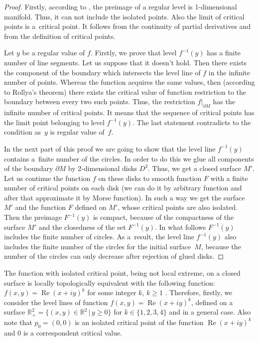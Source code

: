 \documentclass[10pt,a4paper]{amsart}
\numberwithin{equation}{section}
\begin{document}
\begin{proof} Firstly, according to \cite[Lemma~1]{Milnor}, the preimage of a regular level is 1-dimensional manifold. Thus, it can not include the isolated points. Also the limit of critical points is a~critical point. It follows from the continuity of partial derivatives and from the def\/inition of critical points.

Let $y$ be a regular value of $f$. Firstly, we prove that level $f^{-1}(y)$ has a f\/inite number of line segments. Let us suppose that it doesn't hold. Then there exists the component of the boundary which intersects the level line of $f$ in the inf\/inite number of points. Whereas the function acquires the same values, then (according to Rollya's theorem) there exists the critical value of function restriction to the boundary between every two such points. Thus, the restriction $f|_{\partial M}$ has the inf\/inite number of critical points. It means that the sequence of critical points has the limit point belonging to level $f^{-1}(y)$. The last statement contradicts to the condition as~$y$ is regular value of~$f$.

In the next part of this proof we are going to show that the level line $f^{-1}(y)$ contains a~f\/inite number of the circles. In order to do this we glue all components of the boundary $\partial M$ by 2-di\-men\-sional disks $D^{2}$. Thus, we get a closed surface $M'$. Let us continue the function $f$ on these disks to smooth function $F$ with a f\/inite number of critical points on each disk (we can do it by arbitrary function and after that approximate it by Morse function). In such a way we get the surface $M'$ and the function $F$ def\/ined on $M'$, whose critical points are also isolated. Then the preimage $F^{-1}(y)$ is compact, because of the compactness of the surface $M'$ and the closedness of the set $F^{-1}(y)$. In what follows $F^{-1}(y)$ includes the f\/inite number of circles. As a~result, the level line $f^{-1}(y)$ also includes the f\/inite number of the circles for the initial surface~$M$, because the number of the circles can only decrease after rejection of glued disks.
\end{proof}

The function with isolated critical point, being not local extreme, on a closed surface is locally topologically equivalent with the following function: $f(x,y)=\operatorname{Re}(x+iy)^{k}$ for some integer $k$, $k\geq1$ \cite{Prishlyak2002}. Therefore, f\/irstly, we consider the level lines of function $f(x,y)=\operatorname{Re}(x+iy)^{k}$, def\/ined on a surface $\mathbb{R}^2_{+}=\{(x,y)\in\mathbb{R}^2\,|\,y\geq0\}$ for $k\in\{1,2,3,4\}$ and in a general case. Also note that $p_0=(0,0)$ is an isolated critical point of the function $\operatorname{Re}(x+iy)^k$ and $0$ is a correspondent critical value.
\end{document}
